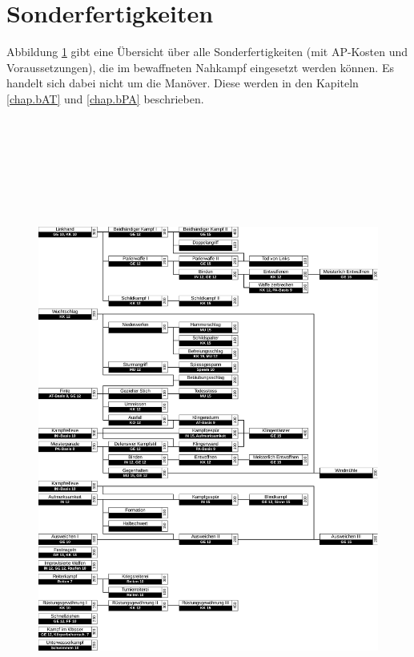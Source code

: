 %

\section{Sonderfertigkeiten}
Abbildung \ref{fig.nSF} gibt eine Übersicht über alle Sonderfertigkeiten (mit AP-Kosten und Voraussetzungen), die im bewaffneten Nahkampf eingesetzt werden können.
Es handelt sich dabei nicht um die Manöver.
Diese werden in den Kapiteln \ref{chap.bAT} und \ref{chap.bPA} beschrieben.

\begin{figure}
    \label{fig.nSF}
    \centering
    \includegraphics[width=16.986cm,height=21.179cm]{fig/bSF.pdf}
\end{figure}

